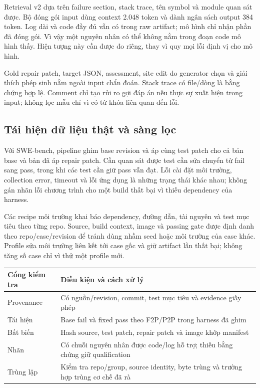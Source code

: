 \documentclass[12pt,a4paper]{article}
\begin{document}
Retrieval v2 dựa trên failure section, stack trace, tên symbol và module quan sát được. Bộ đóng gói input dùng context 2.048 token và dành ngân sách output 384 token. Log dài và code đầy đủ vẫn có trong raw artifact; mô hình chỉ nhận phần đã đóng gói. Vì vậy một nguyên nhân có thể không nằm trong đoạn code mô hình thấy. Hiện tượng này cần được đo riêng, thay vì quy mọi lỗi định vị cho mô hình.

Gold repair patch, target JSON, assessment, site edit do generator chọn và giải thích phép sinh nằm ngoài input chẩn đoán. Stack trace có file/dòng là bằng chứng hợp lệ. Comment chỉ tạo rủi ro gợi đáp án nếu thực sự xuất hiện trong input; không lọc mẫu chỉ vì có từ khóa liên quan đến lỗi.

\nextpage
\subsection{Tái hiện dữ liệu thật và sàng lọc}
Với SWE-bench, pipeline ghim base revision và áp cùng test patch cho cả bản base và bản đã áp repair patch. Cần quan sát được test cần sửa chuyển từ fail sang pass, trong khi các test cần giữ pass vẫn đạt. Lỗi cài đặt môi trường, collection error, timeout và lỗi ứng dụng là những trạng thái khác nhau; không gán nhãn lỗi chương trình cho một build thất bại vì thiếu dependency của harness.

Các recipe môi trường khai báo dependency, đường dẫn, tài nguyên và test mục tiêu theo từng repo. Source, build context, image và passing gate được định danh theo repo/case/revision để tránh dùng nhầm seed hoặc môi trường của case khác. Profile sửa môi trường liên kết tới case gốc và giữ artifact lần thất bại; không tăng số case chỉ vì thử một profile mới.

\begin{center}\small
\begin{tabularx}{\linewidth}{lX}\toprule
Cổng kiểm tra & Điều kiện và cách xử lý\\\midrule
Provenance & Có nguồn/revision, commit, test mục tiêu và evidence giấy phép\\
Tái hiện & Base fail và fixed pass theo F2P/P2P trong harness đã ghim\\
Bất biến & Hash source, test patch, repair patch và image khớp manifest\\
Nhãn & Có chuỗi nguyên nhân được code/log hỗ trợ; thiếu bằng chứng giữ qualification\\
Trùng lặp & Kiểm tra repo/group, source identity, byte trùng và trường hợp trùng cơ chế đã rà\\\bottomrule
\end{tabularx}\end{center}
\end{document}
